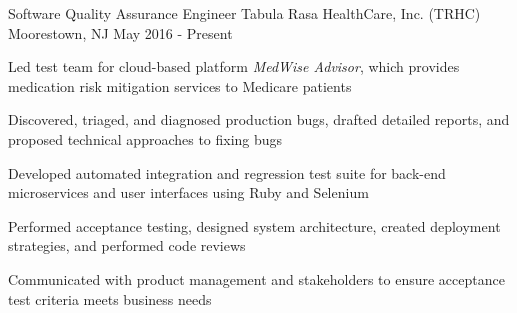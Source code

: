 \begin{cventries}
%

  \cventry
    {Software Quality Assurance Engineer} %
    {Tabula Rasa HealthCare, Inc. (TRHC)} %
    {Moorestown, NJ} %
    {May 2016 - Present} %
    {
      \begin{cvitems} %
        \item {Led test team for cloud-based platform \emph{MedWise Advisor}, which provides medication risk mitigation services to Medicare patients}
        \item {Discovered, triaged, and diagnosed production bugs, drafted detailed reports, and proposed technical approaches to fixing bugs}
        \item {Developed automated integration and regression test suite for back-end microservices and user interfaces using Ruby and Selenium}
        \item {Performed acceptance testing, designed system architecture, created deployment strategies, and performed code reviews}
        \item {Communicated with product management and stakeholders to ensure acceptance test criteria meets business needs}
      \end{cvitems}
    }


\end{cventries}
